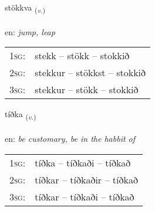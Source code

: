 \documentclass[frontgrid, backgrid]{flacards}\usepackage[]{graphicx}\usepackage[]{color}
\begin{document}
\renewcommand{\flhead}{\vskip5pt \fboxsep=0pt {\small\bfseries\footnotesize Sagnorð | Verb}}
\renewcommand{\fcfoot}{\vskip5pt \fboxsep=0pt \hspace{2pt}{\small\bfseries\footnotesize 2K}}

\renewcommand{\blhead}{\vskip5pt {\small\bfseries\footnotesize Sagnorð | Verb }}
\renewcommand{\bcfoot}{\vskip5pt \hspace{2pt}{\small\bfseries\footnotesize 2K}}


{stökkva \small{\textsubscript{(\textit{v.})}} \\[1ex] %
\textphonetic{[stœhkva]} \\
en: \emph{jump, leap} \\  [2ex]
\renewcommand*{\arraystretch}{0.8}
\begin{tabular}{p{1cm}l}
\textsc{1sg}: & stekk -- stökk -- stokkið \\ 
\textsc{2sg}: & stekkur -- stökkst -- stokkið \\ 
\textsc{3sg}: & stekkur -- stökk -- stokkið \\ 
\end{tabular}
}

\renewcommand{\flhead}{\vskip5pt \fboxsep=0pt {\small\bfseries\footnotesize Sagnorð | Verb}}
\renewcommand{\fcfoot}{\vskip5pt \fboxsep=0pt \hspace{2pt}{\small\bfseries\footnotesize 2K}}

\renewcommand{\blhead}{\vskip5pt {\small\bfseries\footnotesize Sagnorð | Verb }}
\renewcommand{\bcfoot}{\vskip5pt \hspace{2pt}{\small\bfseries\footnotesize 2K}}


{tíðka \small{\textsubscript{(\textit{v.})}} \\[1ex] %
\textphonetic{[tʰiθka]} \\
en: \emph{be customary, be in the habbit of} \\  [2ex]
\renewcommand*{\arraystretch}{0.8}
\begin{tabular}{p{1cm}l}
\textsc{1sg}: & tíðka -- tíðkaði -- tíðkað \\ 
\textsc{2sg}: & tíðkar -- tíðkaðir -- tíðkað \\ 
\textsc{3sg}: & tíðkar -- tíðkaði -- tíðkað \\ 
\end{tabular}
}
\end{document}
